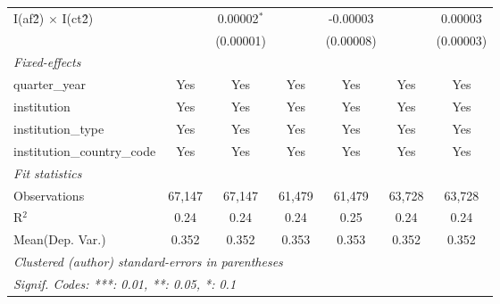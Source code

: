 \begin{tabular}{lcccccc}
   I(af\^2) $\times$ I(ct\^2)         &               & 0.00002$^{*}$   &               & -0.00003        &               & 0.00003\\   
                                      &               & (0.00001)       &               & (0.00008)       &               & (0.00003)\\   
   \midrule
   \emph{Fixed-effects}\\
   quarter\_year                      & Yes           & Yes             & Yes           & Yes             & Yes           & Yes\\  
   institution                        & Yes           & Yes             & Yes           & Yes             & Yes           & Yes\\  
   institution\_type                  & Yes           & Yes             & Yes           & Yes             & Yes           & Yes\\  
   institution\_country\_code         & Yes           & Yes             & Yes           & Yes             & Yes           & Yes\\  
   \midrule
   \emph{Fit statistics}\\
   Observations                       & 67,147        & 67,147          & 61,479        & 61,479          & 63,728        & 63,728\\  
   R$^2$                              & 0.24          & 0.24            & 0.24          & 0.25            & 0.24          & 0.24\\  
Mean(Dep. Var.) & 0.352 & 0.352 & 0.353 & 0.353 & 0.352 & 0.352 \\
   \midrule \midrule
   \multicolumn{7}{l}{\emph{Clustered (author) standard-errors in parentheses}}\\
   \multicolumn{7}{l}{\emph{Signif. Codes: ***: 0.01, **: 0.05, *: 0.1}}\\
\end{tabular}
\par\endgroup
